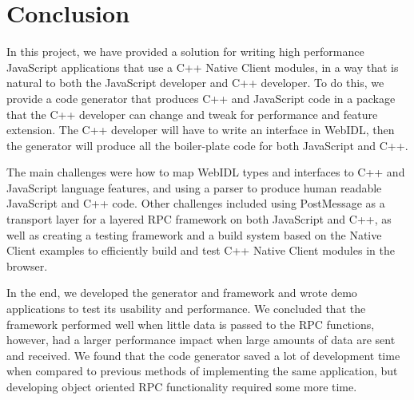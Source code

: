 \chapter{Conclusion}
\label{Chapter6}

In this project, we have provided a solution for writing high performance JavaScript applications that use a C++ Native Client modules, in a way that is natural to both the JavaScript developer and C++ developer. To do this, we provide a code generator that produces C++ and JavaScript code in a package that the C++ developer can change and tweak for performance and feature extension. The C++ developer will have to write an interface in WebIDL, then the generator will produce all the boiler-plate code for both JavaScript and C++.

The main challenges were how to map WebIDL types and interfaces to C++ and JavaScript language features, and using a parser to produce human readable JavaScript and C++ code. Other challenges included using PostMessage as a transport layer for a layered RPC framework on both JavaScript and C++, as well as creating a testing framework and a build system based on the Native Client examples to efficiently build and test C++ Native Client modules in the browser.

In the end, we developed the generator and framework and wrote demo applications to test its usability and performance. We concluded that the framework performed well when little data is passed to the RPC functions, however, had a larger performance impact when large amounts of data are sent and received. We found that the code generator saved a lot of development time when compared to previous methods of implementing the same application, but developing object oriented RPC functionality required some more time.

\newpage
